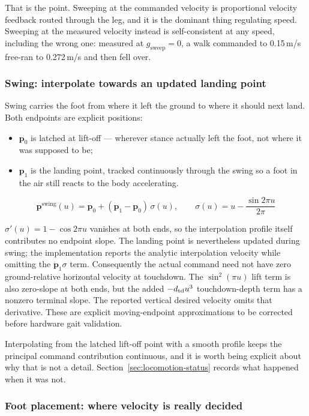 \documentclass[11pt,a4paper]{article}
\begin{document}
That is the point. Sweeping at the commanded velocity is proportional velocity
feedback routed through the leg, and it is the dominant thing regulating speed.
Sweeping at the measured velocity instead is self-consistent at any speed,
including the wrong one: measured at $g_{\text{sweep}} = 0$, a walk commanded
to 0.15\,m/s free-ran to 0.272\,m/s and then fell over.

\subsubsection{Swing: interpolate towards an updated landing point}

Swing carries the foot from where it left the ground to where it should next
land. Both endpoints are explicit positions:

\begin{itemize}
  \item $\mathbf{p}_0$ is latched at lift-off --- wherever stance actually left
    the foot, not where it was supposed to be;
  \item $\mathbf{p}_1$ is the landing point, tracked continuously through the
    swing so a foot in the air still reacts to the body accelerating.
\end{itemize}

\[
  \mathbf{p}^{\text{swing}}(u)
    = \mathbf{p}_0 + (\mathbf{p}_1 - \mathbf{p}_0)\,\sigma(u),
  \qquad
  \sigma(u) = u - \frac{\sin 2\pi u}{2\pi}
\]

$\sigma'(u) = 1 - \cos 2\pi u$ vanishes at both ends, so the interpolation
profile itself contributes no endpoint slope. The landing point is nevertheless
updated during swing; the implementation reports the analytic interpolation
velocity while omitting the $\dot{\mathbf p}_1\sigma$ term. Consequently the
actual command need not have zero ground-relative horizontal velocity at
touchdown. The $\sin^2(\pi u)$ lift term is also zero-slope at both ends, but
the added $-d_{\rm td}u^3$ touchdown-depth term has a nonzero terminal slope.
The reported vertical desired velocity omits that derivative. These are explicit
moving-endpoint approximations to be corrected before hardware gait validation.

Interpolating from the latched lift-off point with a smooth profile keeps the
principal command contribution continuous, and it is worth being explicit
about why that is not a detail.
Section~\ref{sec:locomotion-status} records what happened when it was not.

\subsubsection{Foot placement: where velocity is really decided}
\end{document}
